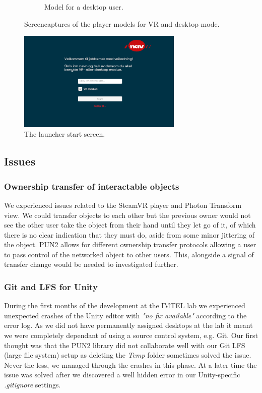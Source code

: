\begin{figure}[]
\begin{subfigure}[b]{0.29\textwidth}
    \caption{Model for a desktop user.}
    \label{fig:phase1Desktopmode}
  \end{subfigure}
  \hfill%
  \caption{Screencaptures of the player models for VR and desktop mode.}
  \label{fig:phase1PlayerModels}
\end{figure}

\begin{figure}[]
  \centering
    \captionsetup{width=.7\linewidth}
    \includegraphics[width=0.7\textwidth]{fig/phase_1/launcher1.PNG}
 \caption{The launcher start screen.}
\label{fig:launcherPhase1}
\end{figure}



\subsection{Issues}

\subsubsection{Ownership transfer of interactable objects}
We experienced issues related to the SteamVR player and Photon Transform view. We could transfer objects to each other but the previous owner would not see the other user take the object from their hand until they let go of it, of which there is no clear indication that they must do, aside from some minor jittering of the object. PUN2 allows for different ownership transfer protocols allowing a user to pass control of the networked object to other users.  This, alongside a signal of transfer change would be needed to investigated further. 

\subsubsection{Git and LFS for Unity}
During the first months of the development at the IMTEL lab we experienced unexpected crashes of the Unity editor with \textit{"no fix available"} according to the error log. As we did not have permanently assigned desktops at the lab it meant we were completely dependant of using a source control system, e.g. Git. Our first thought was that the PUN2 library did not collaborate well with our Git LFS (large file system) setup as deleting the \textit{Temp} folder sometimes solved the issue. Never the less, we managed through the crashes in this phase. At a later time the issue was solved after we discovered a well hidden error in our Unity-specific \textit{.gitignore} settings.   



